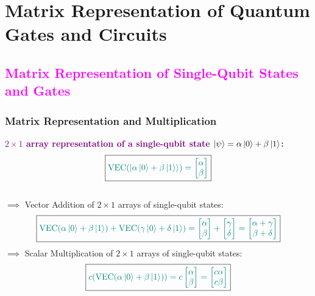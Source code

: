 \documentclass{book}
\begin{document}
\chapter{Matrix Representation of Quantum Gates and Circuits}
\textcolor{magenta}{\section{\textbf{Matrix Representation of Single-Qubit States and Gates}}}
\subsection{Matrix Representation and Multiplication}
\textcolor{purple}{\textbf{$2 \times 1$ array representation of a single-qubit state $\ket{\psi} = \alpha\ket{0} + \beta\ket{1}$:}}
\[
    \boxed{\textcolor{teal}{\text{VEC}(\ket{\alpha\ket{0} + \beta\ket{1}}) = \begin{bmatrix} \alpha \\ \beta \end{bmatrix}}}
\]
\\
\vspace{2mm}
$\implies$ Vector Addition of $2 \times 1$ arrays of single-qubit states:
\[
    \boxed{\textcolor{teal}{\text{VEC}(\alpha\ket{0} + \beta\ket{1}) + \text{VEC}(\gamma\ket{0} + \delta\ket{1}) = \begin{bmatrix} \alpha \\ \beta \end{bmatrix} + \begin{bmatrix} \gamma \\ \delta \end{bmatrix} = \begin{bmatrix} \alpha + \gamma \\ \beta + \delta \end{bmatrix}}}
\]
$\implies$ Scalar Multiplication of $2 \times 1$ arrays of single-qubit states:
\[
    \boxed{\textcolor{teal}{c(\text{VEC}(\alpha\ket{0} + \beta\ket{1})) = c \begin{bmatrix} \alpha \\ \beta \end{bmatrix} = \begin{bmatrix} c\alpha \\ c\beta \end{bmatrix}}} 
\]
\end{document}
